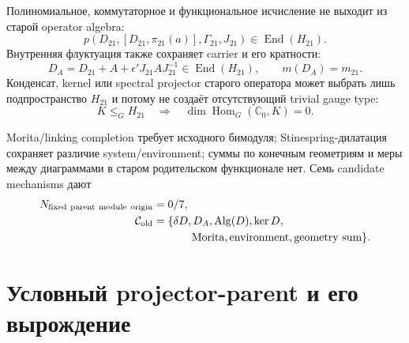 Полиномиальное, коммутаторное и функциональное исчисление не выходит из
старой operator algebra:
\begin{equation}
 p(D_{21},[D_{21},\pi_{21}(a)],\Gamma_{21},J_{21})
 \in\operatorname{End}(H_{21}).
 \label{eq:v9-endpoint-parent-old-operator-closure}
\end{equation}
Внутренняя флуктуация также сохраняет carrier и его кратности:
\begin{equation}
 D_A=D_{21}+A+\epsilon'J_{21}AJ_{21}^{-1}
 \in\operatorname{End}(H_{21}),
 \qquad m(D_A)=m_{21}.
 \label{eq:v9-endpoint-parent-inner-fluctuation}
\end{equation}
Конденсат, kernel или spectral projector старого оператора может выбрать
лишь подпространство $H_{21}$ и потому не создаёт отсутствующий trivial
gauge type:
\begin{equation}
 K\le_G H_{21}
 \quad\Longrightarrow\quad
 \dim\operatorname{Hom}_G(\mathbb C_0,K)=0.
 \label{eq:v9-endpoint-parent-subspace-no-neutral}
\end{equation}

Morita/linking completion требует исходного бимодуля; Stinespring-дилатация
сохраняет различие system/environment; суммы по конечным геометриям и меры
между диаграммами в старом родительском функционале нет. Семь candidate mechanisms дают
\begin{equation}
 \begin{aligned}
 N_{\rm fixed\ parent\ module\ origin}&=0/7,\\
 \mathcal C_{\rm old}&=\{\delta D,D_A,\operatorname{Alg}(D),\ker D,\\
 &\hspace{3.5em}\text{Morita},\text{environment},\text{geometry sum}\}.
 \end{aligned}
 \label{eq:v9-endpoint-parent-candidate-ledger}
\end{equation}

\section{Условный projector-parent и его вырождение}

